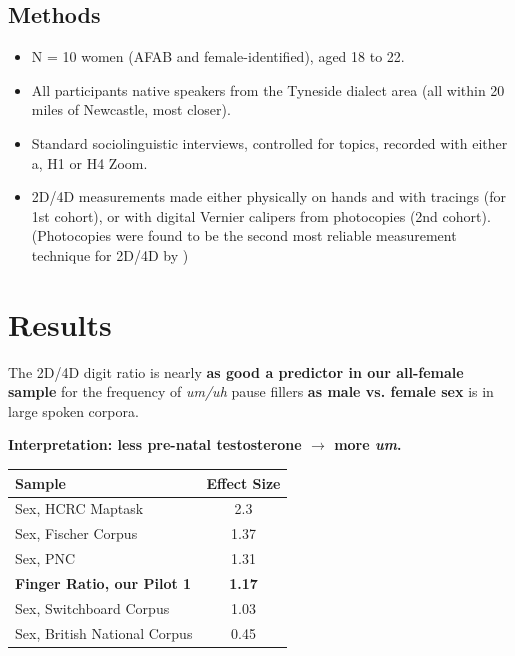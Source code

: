 \documentclass[a0,portrait]{a0poster}
\begin{document}
\begin{multicols}{2}
\subsection*{Methods}
\begin{itemize}
	\item N = 10 women (AFAB and female-identified), aged 18 to 22.
	\item All participants native speakers from the Tyneside dialect area (all within 20 miles of Newcastle, most closer).
	\item Standard sociolinguistic interviews, controlled for topics, recorded with either a, H1 or H4 Zoom.
	\item 2D/4D measurements made either physically on hands and with tracings (for 1st cohort), or with digital Vernier calipers from photocopies (2nd cohort). (Photocopies were found to be the second most reliable measurement technique for 2D/4D by \citealt{allawayetal2009})
\end{itemize}



\section*{Results}



The 2D/4D digit ratio is nearly \textbf{as good a predictor in our all-female sample} for the frequency of \textsl{um/uh} pause fillers  \textbf{as male vs. female sex} is in large spoken corpora.
\begin{center}
\noindent\textbf{Interpretation: less pre-natal testosterone $\rightarrow$ more \textsl{um}.}
\end{center}
\begin{table} %
\begin{tabular}{l c}
\toprule
\textbf{Sample} & \textbf{Effect Size}\\
\midrule
Sex, HCRC Maptask & 2.3\\
Sex, Fischer Corpus & 1.37\\
Sex, PNC & 1.31\\
\textbf{Finger Ratio, our Pilot 1} & \textbf{1.17}\\
Sex, Switchboard Corpus & 1.03\\
Sex, British National Corpus & 0.45\\
\bottomrule
\end{tabular}
\end{table}


\end{multicols}
\end{document}
